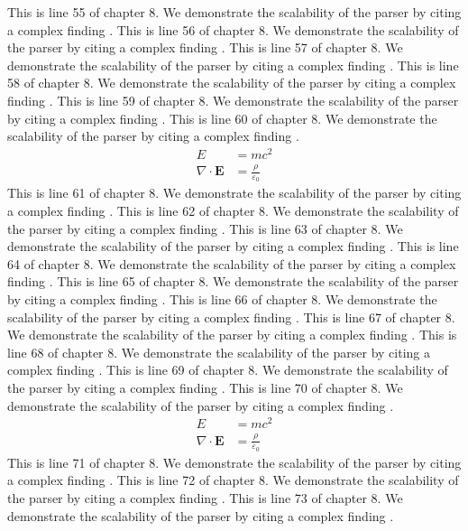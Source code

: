 This is line 55 of chapter 8. We demonstrate the scalability of the parser by citing a complex finding \cite{ref8_55}.
This is line 56 of chapter 8. We demonstrate the scalability of the parser by citing a complex finding \cite{ref8_56}.
This is line 57 of chapter 8. We demonstrate the scalability of the parser by citing a complex finding \cite{ref8_57}.
This is line 58 of chapter 8. We demonstrate the scalability of the parser by citing a complex finding \cite{ref8_58}.
This is line 59 of chapter 8. We demonstrate the scalability of the parser by citing a complex finding \cite{ref8_59}.
This is line 60 of chapter 8. We demonstrate the scalability of the parser by citing a complex finding \cite{ref8_60}.
\begin{align*}
  E &= mc^2 \\
  \nabla \cdot \mathbf{E} &= \frac{\rho}{\varepsilon_0}
\end{align*}
This is line 61 of chapter 8. We demonstrate the scalability of the parser by citing a complex finding \cite{ref8_61}.
This is line 62 of chapter 8. We demonstrate the scalability of the parser by citing a complex finding \cite{ref8_62}.
This is line 63 of chapter 8. We demonstrate the scalability of the parser by citing a complex finding \cite{ref8_63}.
This is line 64 of chapter 8. We demonstrate the scalability of the parser by citing a complex finding \cite{ref8_64}.
This is line 65 of chapter 8. We demonstrate the scalability of the parser by citing a complex finding \cite{ref8_65}.
This is line 66 of chapter 8. We demonstrate the scalability of the parser by citing a complex finding \cite{ref8_66}.
This is line 67 of chapter 8. We demonstrate the scalability of the parser by citing a complex finding \cite{ref8_67}.
This is line 68 of chapter 8. We demonstrate the scalability of the parser by citing a complex finding \cite{ref8_68}.
This is line 69 of chapter 8. We demonstrate the scalability of the parser by citing a complex finding \cite{ref8_69}.
This is line 70 of chapter 8. We demonstrate the scalability of the parser by citing a complex finding \cite{ref8_70}.
\begin{align*}
  E &= mc^2 \\
  \nabla \cdot \mathbf{E} &= \frac{\rho}{\varepsilon_0}
\end{align*}
This is line 71 of chapter 8. We demonstrate the scalability of the parser by citing a complex finding \cite{ref8_71}.
This is line 72 of chapter 8. We demonstrate the scalability of the parser by citing a complex finding \cite{ref8_72}.
This is line 73 of chapter 8. We demonstrate the scalability of the parser by citing a complex finding \cite{ref8_73}.
